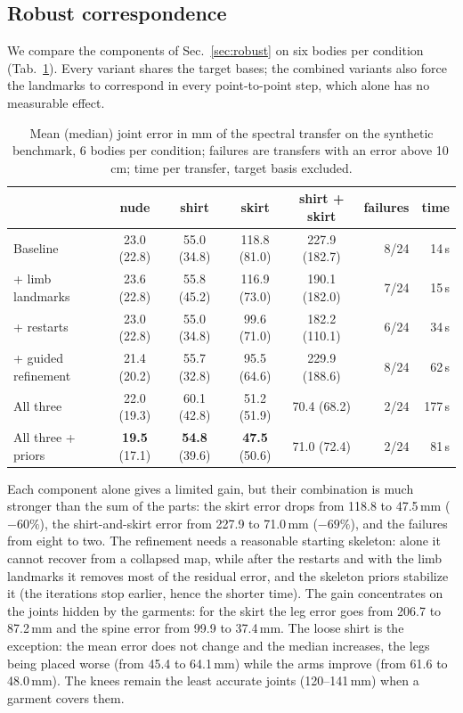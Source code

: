 \documentclass[11pt]{article}
\begin{document}
\subsection{Robust correspondence}
\label{sec:exp_robust}

We compare the components of Sec.~\ref{sec:robust} on six bodies per condition
(Tab.~\ref{tab:variants}). Every variant shares the target bases; the
combined variants also force the landmarks to correspond in every
point-to-point step, which alone has no measurable effect.

\begin{table}[t]
  \centering
  \caption{Mean (median) joint error in mm of the spectral transfer on the
  synthetic benchmark, 6 bodies per condition; failures are transfers with an
  error above 10\,cm; time per transfer, target basis excluded.}
  \label{tab:variants}
  \small
  \begin{tabular}{lccccrr}
    \toprule
    & nude & shirt & skirt & shirt + skirt & failures & time \\
    \midrule
    Baseline                 & 23.0 (22.8) & 55.0 (34.8) & 118.8 (81.0) & 227.9 (182.7) & 8/24 & 14\,s \\
    + limb landmarks         & 23.6 (22.8) & 55.8 (45.2) & 116.9 (73.0) & 190.1 (182.0) & 7/24 & 15\,s \\
    + restarts               & 23.0 (22.8) & 55.0 (34.8) &  99.6 (71.0) & 182.2 (110.1) & 6/24 & 34\,s \\
    + guided refinement      & 21.4 (20.2) & 55.7 (32.8) &  95.5 (64.6) & 229.9 (188.6) & 8/24 & 62\,s \\
    All three                & 22.0 (19.3) & 60.1 (42.8) &  51.2 (51.9) &  70.4 (68.2)  & 2/24 & 177\,s \\
    All three + priors       & \textbf{19.5} (17.1) & \textbf{54.8} (39.6) & \textbf{47.5} (50.6) & 71.0 (72.4) & 2/24 & 81\,s \\
    \bottomrule
  \end{tabular}
\end{table}

Each component alone gives a limited gain, but their combination is much
stronger than the sum of the parts: the skirt error drops from 118.8 to
47.5\,mm ($-60\%$), the shirt-and-skirt error from 227.9 to 71.0\,mm
($-69\%$), and the failures from eight to two. The refinement needs a
reasonable starting skeleton: alone it cannot recover from a collapsed map,
while after the restarts and with the limb landmarks it removes most of the
residual error, and the skeleton priors stabilize it (the iterations stop
earlier, hence the shorter time). The gain concentrates on the joints hidden
by the garments: for the skirt the leg error goes from 206.7 to 87.2\,mm and
the spine error from 99.9 to 37.4\,mm. The loose shirt is the exception: the
mean error does not change and the median increases, the legs being placed
worse (from 45.4 to 64.1\,mm) while the arms improve (from 61.6 to 48.0\,mm).
The knees remain the least accurate joints (120--141\,mm) when a garment
covers them.
\end{document}
